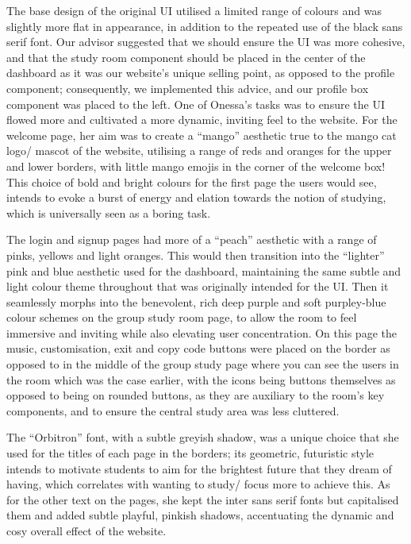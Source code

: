The base design of the original UI utilised a limited range of colours and was slightly more flat in appearance, in addition to the repeated use of the black sans serif font. Our advisor suggested that we should ensure the UI was more cohesive, and that the study room component should be placed in the center of the dashboard as it was our website’s unique selling point, as opposed to the profile component; consequently, we implemented this advice, and our profile box component was placed to the left. 
One of Onessa’s tasks was to ensure the UI flowed more and cultivated a more dynamic, inviting feel to the website. For the welcome page, her aim was to create a “mango” aesthetic true to the mango cat logo/ mascot of the website, utilising a range of reds and oranges for the upper and lower borders, with little mango emojis in the corner of the welcome box! This choice of bold and bright colours for the first page the users would see, intends to evoke a burst of energy and elation towards the notion of studying, which is universally seen as a boring task. 

The login and signup pages had more of a “peach” aesthetic with a range of pinks, yellows and light oranges. This would then transition into the “lighter” pink and blue aesthetic used for the dashboard, maintaining the same subtle and light colour theme throughout that was originally intended for the UI. Then it seamlessly morphs into the benevolent, rich deep purple and soft purpley-blue colour schemes on the group study room page, to allow the room to feel immersive and inviting while also elevating user concentration. On this page the music, customisation, exit and copy code buttons were placed on the border as opposed to in the middle of the group study page where you can see the users in the room which was the case earlier, with the icons being buttons themselves as opposed to being on rounded buttons, as they are auxiliary to the room’s key components, and to ensure the central study area was less cluttered. 

The “Orbitron” font, with a subtle greyish shadow, was a unique choice that she used for the titles of each page in the borders; its geometric, futuristic style intends to motivate students to aim for the brightest future that they dream of having, which correlates with wanting to study/ focus more to achieve this. As for the other text on the pages, she kept the inter sans serif fonts but capitalised them and added subtle playful, pinkish shadows, accentuating the dynamic and cosy overall effect of the website. 

